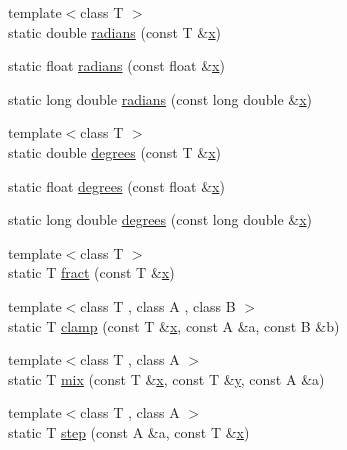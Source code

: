 \begin{DoxyCompactItemize}
\item 
{\footnotesize template$<$class T $>$ }\\static double \hyperlink{namespacetrimesh_ab544311a1caac19fcd9de0556782dac5}{radians} (const T \&\hyperlink{namespacetrimesh_a3365d1b1a1bc5d8e9c844cf589a8c4a8}{x})
\item 
static float \hyperlink{namespacetrimesh_a7d0700b74406bdf2c1d89a761ab9976d}{radians} (const float \&\hyperlink{namespacetrimesh_a3365d1b1a1bc5d8e9c844cf589a8c4a8}{x})
\item 
static long double \hyperlink{namespacetrimesh_ab5bdc2d41abb1c4a85aedf902c33a239}{radians} (const long double \&\hyperlink{namespacetrimesh_a3365d1b1a1bc5d8e9c844cf589a8c4a8}{x})
\item 
{\footnotesize template$<$class T $>$ }\\static double \hyperlink{namespacetrimesh_a115f178dd4c80646d77ad5f61ff20f83}{degrees} (const T \&\hyperlink{namespacetrimesh_a3365d1b1a1bc5d8e9c844cf589a8c4a8}{x})
\item 
static float \hyperlink{namespacetrimesh_a4df1c1f62bc5c8254e4d7c37579add10}{degrees} (const float \&\hyperlink{namespacetrimesh_a3365d1b1a1bc5d8e9c844cf589a8c4a8}{x})
\item 
static long double \hyperlink{namespacetrimesh_a30acf3d700e46bf12b16c60a10efc12d}{degrees} (const long double \&\hyperlink{namespacetrimesh_a3365d1b1a1bc5d8e9c844cf589a8c4a8}{x})
\item 
{\footnotesize template$<$class T $>$ }\\static T \hyperlink{namespacetrimesh_a18250ea8eccf9a09028266592b8d5738}{fract} (const T \&\hyperlink{namespacetrimesh_a3365d1b1a1bc5d8e9c844cf589a8c4a8}{x})
\item 
{\footnotesize template$<$class T , class A , class B $>$ }\\static T \hyperlink{namespacetrimesh_ae913dc8d8f6d1d2161705a6bdd9b4a8f}{clamp} (const T \&\hyperlink{namespacetrimesh_a3365d1b1a1bc5d8e9c844cf589a8c4a8}{x}, const A \&a, const B \&b)
\item 
{\footnotesize template$<$class T , class A $>$ }\\static T \hyperlink{namespacetrimesh_afbfc5cc41975c0039611c6da6cc2f35b}{mix} (const T \&\hyperlink{namespacetrimesh_a3365d1b1a1bc5d8e9c844cf589a8c4a8}{x}, const T \&\hyperlink{namespacetrimesh_a56b35d0eb7039be92fcc4867080c7419}{y}, const A \&a)
\item 
{\footnotesize template$<$class T , class A $>$ }\\static T \hyperlink{namespacetrimesh_acb6637b7876342110a33099891cc23e1}{step} (const A \&a, const T \&\hyperlink{namespacetrimesh_a3365d1b1a1bc5d8e9c844cf589a8c4a8}{x})

\end{DoxyCompactItemize}
